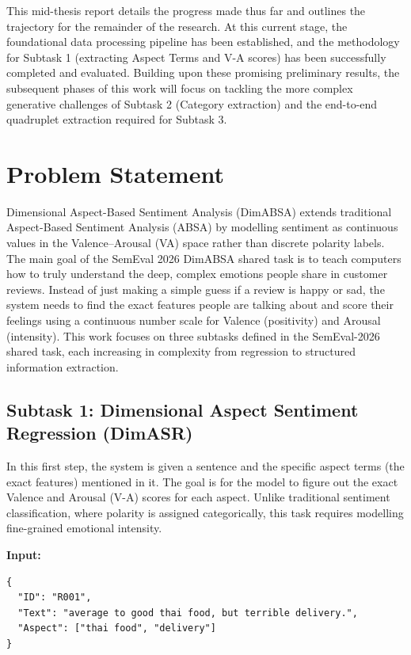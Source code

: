 \documentclass{article}
\begin{document}
This mid-thesis report details the progress made thus far and outlines the trajectory for the remainder of the research. At this current stage, the foundational data processing pipeline has been established, and the methodology for Subtask 1 (extracting Aspect Terms and V-A scores) has been successfully completed and evaluated. Building upon these promising preliminary results, the subsequent phases of this work will focus on tackling the more complex generative challenges of Subtask 2 (Category extraction) and the end-to-end quadruplet extraction required for Subtask 3.

\section{Problem Statement}
\label{sec:problem}

Dimensional Aspect-Based Sentiment Analysis (DimABSA) extends traditional Aspect-Based Sentiment Analysis (ABSA) by modelling sentiment as continuous values in the Valence–Arousal (VA) space rather than discrete polarity labels. The main goal of the SemEval 2026 DimABSA shared task is to teach computers how to truly understand the deep, complex emotions people share in customer reviews. Instead of just making a simple guess if a review is happy or sad, the system needs to find the exact features people are talking about and score their feelings using a continuous number scale for Valence (positivity) and Arousal (intensity). This work focuses on three subtasks defined in the SemEval-2026 shared task, each increasing in complexity from regression to structured information extraction.

\subsection{Subtask 1: Dimensional Aspect Sentiment Regression (DimASR)}

In this first step, the system is given a sentence and the specific aspect terms (the exact features) mentioned in it. The goal is for the model to figure out the exact Valence and Arousal (V-A) scores for each aspect. Unlike traditional sentiment classification, where polarity is assigned categorically, this task requires modelling fine-grained emotional intensity.

\textbf{Input:}
\begin{verbatim}
{
  "ID": "R001",
  "Text": "average to good thai food, but terrible delivery.",
  "Aspect": ["thai food", "delivery"]
}
\end{verbatim}
\end{document}
